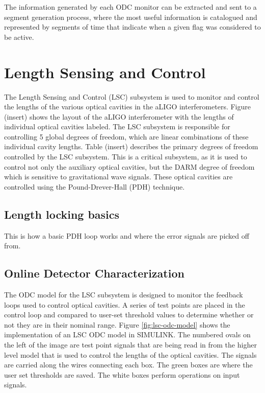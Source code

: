 The information generated by each ODC monitor can be extracted and sent to a segment
generation process, where the most useful information is catalogued and represented by
segments of time that indicate when a given flag was considered to be active.

\section{Length Sensing and Control}

The Length Sensing and Control (LSC) subsystem is 
used to monitor and control the lengths of the various optical cavities in the 
aLIGO interferometers. Figure (insert) shows the layout 
of the aLIGO interferometer with the lengths of individual optical cavities 
labeled. The LSC subsystem is responsible for controlling 5 global degrees of freedom, 
which are linear combinations of these individual cavity lengths. Table (insert) 
describes the primary degrees of freedom controlled by the LSC subsystem. 
This is a critical subsystem, as it is used to control
not only the auxiliary optical cavities, but the DARM degree of freedom which
is sensitive to gravitational wave signals.
These optical cavities are controlled using the Pound-Drever-Hall (PDH) 
technique.

\subsection{Length locking basics}

This is how a basic PDH loop works and where the error signals are picked 
off from.

\subsection{Online Detector Characterization}

The ODC model for the LSC subsystem is designed to monitor the feedback 
loops used to control optical cavities. A series of test points are placed 
in the control loop and compared to user-set threshold values to determine 
whether or not they are in their nominal range. 
Figure \ref{fig:lsc-odc-model} shows the implementation of an LSC ODC 
model in SIMULINK. The numbered ovals on the left of the image are test point 
signals that are being read in from the higher level model that is used to control the 
lengths of the optical cavities. The signals are carried along the wires connecting 
each box. The green boxes are where the user set thresholds are saved. The white 
boxes perform operations on input signals.

